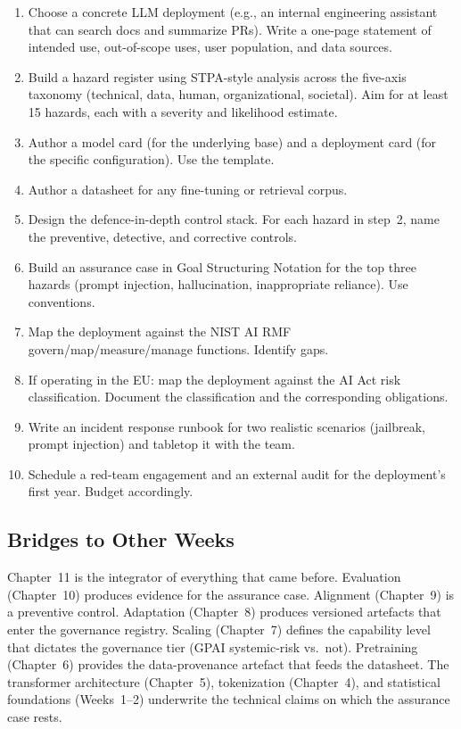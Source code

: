 \begin{enumerate}
  \item Choose a concrete LLM deployment (e.g., an internal
        engineering assistant that can search docs and summarize
        PRs). Write a one-page statement of intended use,
        out-of-scope uses, user population, and data sources.
  \item Build a hazard register using STPA-style analysis across
        the five-axis taxonomy (technical, data, human,
        organizational, societal). Aim for at least 15 hazards,
        each with a severity and likelihood estimate.
  \item Author a model card (for the underlying base) and a
        deployment card (for the specific configuration). Use
        the \citet{mitchell2019modelcards} template.
  \item Author a datasheet \citep{gebru2021datasheets} for any
        fine-tuning or retrieval corpus.
  \item Design the defence-in-depth control stack. For each
        hazard in step~2, name the preventive, detective, and
        corrective controls.
  \item Build an assurance case in Goal Structuring Notation for
        the top three hazards (prompt injection, hallucination,
        inappropriate reliance). Use \citet{gsn2021}
        conventions.
  \item Map the deployment against the NIST AI RMF
        \citep{nist2023airmf} govern/map/measure/manage
        functions. Identify gaps.
  \item If operating in the EU: map the deployment against the
        AI Act \citep{eu_aiact_2024} risk classification.
        Document the classification and the corresponding
        obligations.
  \item Write an incident response runbook for two realistic
        scenarios (jailbreak, prompt injection) and tabletop it
        with the team.
  \item Schedule a red-team engagement and an external audit for
        the deployment's first year. Budget accordingly.
\end{enumerate}

\subsection{Bridges to Other Weeks}

Chapter~11 is the integrator of everything that came before.
Evaluation (Chapter~10) produces evidence for the assurance case.
Alignment (Chapter~9) is a preventive control. Adaptation (Chapter~8)
produces versioned artefacts that enter the governance registry.
Scaling (Chapter~7) defines the capability level that dictates the
governance tier (GPAI systemic-risk vs.\ not).
Pretraining (Chapter~6) provides the data-provenance artefact that
feeds the datasheet. The transformer architecture (Chapter~5),
tokenization (Chapter~4), and statistical foundations (Weeks~1--2)
underwrite the technical claims on which the assurance case
rests.

